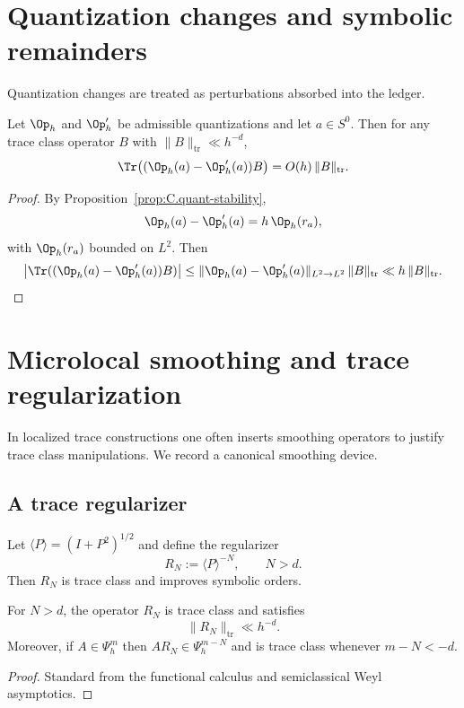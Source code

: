 \section{Quantization changes and symbolic remainders}
\label{sec:C.quantization-changes}

Quantization changes are treated as perturbations absorbed into the ledger.

\begin{proposition}
\label{prop:C.quantization-change}
Let $\Op_h$ and $\Op'_h$ be admissible quantizations and let $a\in S^0$.
Then for any trace class operator $B$ with $\|B\|_{\mathrm{tr}}\ll h^{-d}$,
\[
\Tr\bigl((\Op_h(a)-\Op'_h(a))B\bigr)
=
O(h)\,\|B\|_{\mathrm{tr}}.
\]
\end{proposition}

\begin{proof}
By Proposition~\ref{prop:C.quant-stability},
\[
\Op_h(a)-\Op'_h(a)=h\,\Op_h(r_a),
\]
with $\Op_h(r_a)$ bounded on $L^2$.  Then
\[
\left|\Tr((\Op_h(a)-\Op'_h(a))B)\right|
\le
\|\Op_h(a)-\Op'_h(a)\|_{L^2\to L^2}\,\|B\|_{\mathrm{tr}}
\ll
h\,\|B\|_{\mathrm{tr}}.
\]
\end{proof}

\section{Microlocal smoothing and trace regularization}
\label{sec:C.smoothing}

In localized trace constructions one often inserts smoothing operators to justify trace class manipulations.
We record a canonical smoothing device.

\subsection{A trace regularizer}
\label{subsec:C.regularizer}

Let $\langle P\rangle=(I+P^2)^{1/2}$ and define the regularizer
\[
R_N := \langle P\rangle^{-N},
\qquad N>d.
\]
Then $R_N$ is trace class and improves symbolic orders.

\begin{lemma}
\label{lem:C.regularizer}
For $N>d$, the operator $R_N$ is trace class and satisfies
\[
\|R_N\|_{\mathrm{tr}}\ll h^{-d}.
\]
Moreover, if $A\in \Psi_h^m$ then $AR_N\in \Psi_h^{m-N}$ and is trace class whenever $m-N<-d$.
\end{lemma}

\begin{proof}
Standard from the functional calculus and semiclassical Weyl asymptotics.
\end{proof}

